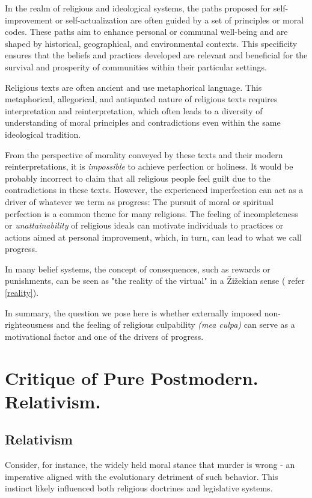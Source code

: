 \documentclass[11pt,a4]{article}
\begin{document}
    In the realm of religious and ideological systems, the paths proposed for self-improvement or
    self-actualization are often guided by a set of principles or moral codes. These paths aim to
    enhance personal or communal well-being and are shaped by historical, geographical,
    and environmental contexts. This specificity ensures that the beliefs and practices developed
    are relevant and beneficial for the survival and prosperity of communities within their
    particular settings.

    Religious texts are often ancient and use metaphorical language. This metaphorical, allegorical,
    and antiquated nature of religious texts requires interpretation and reinterpretation, which often
    leads to a diversity of understanding of moral principles and contradictions even within the same
    ideological tradition.

    From the perspective of morality conveyed by these texts and their modern reinterpretations, it
    is \textit{impossible} to achieve perfection or holiness. It would be probably incorrect to claim
    that all religious people feel guilt due to the contradictions in these texts. However, the
    experienced imperfection can act as a driver of whatever we term as progress: The pursuit of
    moral or spiritual perfection is a common theme for many religions. The feeling of incompleteness
    or \textit{unattainability} of religious ideals can motivate individuals to practices or actions
    aimed at personal improvement, which, in turn, can lead to what we call progress.

    In many belief systems, the concept of consequences, such as rewards or punishments, can
    be seen as "the reality of the virtual" in a Žižekian sense ( refer \ref{reality}).

    In summary, the question we pose here is whether externally imposed non-righteousness and the
    feeling of religious culpability \textit{(mea culpa)} can serve as a motivational factor and one
    of the drivers of progress.



\newpage
\section{Critique of Pure Postmodern. Relativism.}


\subsection{Relativism}\label{relativism}
    Consider, for instance, the widely held moral stance that murder is wrong - an imperative aligned
    with the evolutionary detriment of such behavior. This instinct likely influenced both religious
    doctrines and legislative systems.
\end{document}
